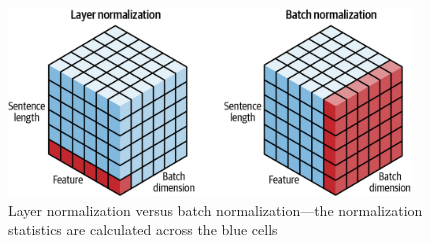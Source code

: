 \begin{figure}
    \begin{center}
        \includegraphics[width=0.95\textwidth]{figures/layer_norm}
    \end{center}
    \caption{Layer normalization versus batch normalization—the normalization statistics are calculated across the blue cells~\cite{shen2020powernorm}}\label{fig:layer_norm}
\end{figure}


